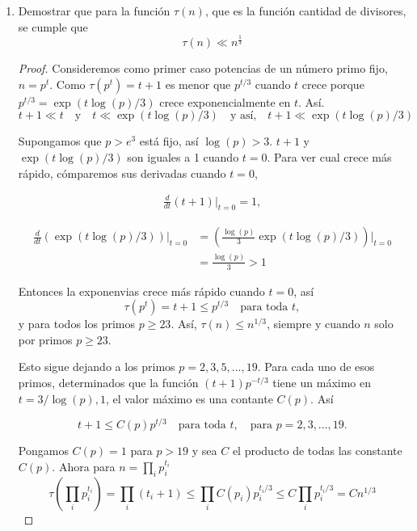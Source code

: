 \documentclass[letterpaper]{article}
\begin{document}
\begin{enumerate}

\item Demostrar que para la función $\tau(n)$, que es la función cantidad de divisores, se cumple que
\[
    \tau(n) \ll n^{\frac{1}{3}}
\]

\begin{proof}
Consideremos como primer caso potencias de un número primo fijo, $n = p^t$. Como $\tau(p^t) = t + 1$
es menor que $p^{t/3}$ cuando $t$ crece porque $p^{t/3} = \exp(t \log(p) / 3)$ crece exponencialmente en $t$. Así.
\[
    t + 1 \ll t \quad\text{y}\quad t \ll \exp(t\log(p)/3) \quad\text{y así,}\quad
    t + 1 \ll \exp(t\log(p)/3)
\]

Supongamos que $p > e^3$ está fijo, así $\log(p) > 3$. $t+1$ y $\exp(t \log(p) / 3)$ son iguales a 1 cuando
$t = 0$. Para ver cual crece más rápido, cómparemos sus derivadas cuando $t = 0$,

\begin{align*}
    \frac{d}{dt} (t+1) \Bigr|_{t = 0} = 1,
\end{align*}

\begin{align*}
    \frac{d}{dt} (\exp(t \log(p)/3))\Bigr|_{t = 0}
        &= \left( \frac{\log(p)}{3} \exp(t \log(p) / 3) \right)\Bigr|_{t = 0}\\
        &= \frac{\log(p)}{3} > 1
\end{align*}

Entonces la exponenvias crece más rápido cuando $t = 0$, así
\[
    \tau(p^t) = t + 1 \leq p^{t/3} \quad \text{para toda } t,
\]
y para todos los primos $p \geq 23$. Así, $\tau(n) \leq n^{1/3}$, siempre y cuando $n$ solo por primos $p \geq 23$.


Esto sigue dejando a los primos $p = 2,3,5, \ldots, 19$. Para cada uno de esos primos, determinados que la función
$(t+1)p^{-t/3}$ tiene un máximo en $t = 3/\log(p) ,1$, el valor máximo es una contante $C(p)$. Así

\[
    t + 1 \leq C(p)p^{t/3} \quad\text{para toda }t,\quad \text{para } p=2,3,\ldots,19.
\]

Pongamos $C(p) = 1$ para $p > 19$ y sea $C$ el producto de todas las constante $C(p)$. Ahora para
$n = \prod_i p_i^{t_i}$
\[
    \tau(\prod_i p_i^{t_i}) = \prod_i (t_i + 1) \leq \prod_i C(p_i) p_i^{t_i/3} \leq C \prod_i p_i^{t_i/3} = Cn^{1/3}
\]

\end{proof}


\end{enumerate}
\end{document}
